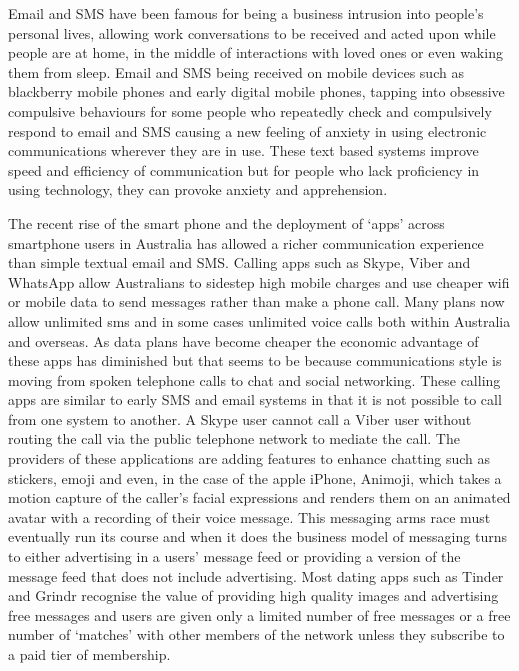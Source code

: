 Email and SMS have been famous for being a business intrusion into people's personal lives, allowing work conversations to be received and acted upon while people are at home, in the middle of interactions with loved ones or even waking them from sleep. Email and SMS being received on mobile devices such as blackberry mobile phones and early digital mobile phones, tapping into obsessive compulsive behaviours for some people who repeatedly check and compulsively respond to email and SMS causing a new feeling of anxiety in using electronic communications wherever they are in use. These text based systems improve speed and efficiency of communication but for people who lack proficiency in using technology, they can provoke anxiety and apprehension\cite{RefWorks:436}.

The recent rise of the smart phone and the deployment of `apps' across smartphone users in Australia has allowed a richer communication experience than simple textual email and SMS. Calling apps such as Skype, Viber and WhatsApp allow Australians to sidestep high mobile charges and use cheaper wifi or mobile data to send messages rather than make a phone call. Many plans now allow unlimited sms and in some cases unlimited voice calls both within Australia and overseas.  As data plans have become cheaper the economic advantage of these apps has diminished but that seems to be because communications style is moving from spoken telephone calls to chat and social networking. These calling apps are similar to early SMS and email systems in that it is not possible to call from one system to another. A Skype user cannot call a Viber user without routing the call via the public telephone network to mediate the call. The providers of these applications are adding features to enhance chatting such as stickers, emoji and even, in the case of the apple iPhone, Animoji, which takes a motion capture of the caller's facial expressions and renders them on an animated avatar with a recording of their voice message. This messaging arms race must eventually run its course and when it does the business model of messaging turns to either advertising in a users' message feed or providing a version of the message feed that does not include advertising\cite{RefWorks:437}. Most dating apps such as Tinder and Grindr recognise the value of providing high quality images and advertising free messages and users are given only a limited number of free messages or a free number of `matches' with other members of the network unless they subscribe to a paid tier of membership.


